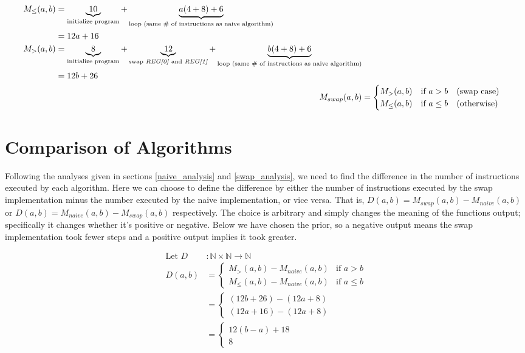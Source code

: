 \documentclass[a4paper,10pt,fleqn]{article}
\begin{document}
\begin{align*}
  \begin{split}
    M_{\leq}(a,b) & = \underbrace{10}_{\text{initialize program}} + \underbrace{a(4 + 8) + 6}_{\text{loop (same \# of instructions as naive algorithm)}} \\
    & = 12a + 16 \\
    M_{>}(a,b) & = \underbrace{8}_{\text{initialize program}} + \underbrace{12}_{\text{swap \emph{REG[0]} and \emph{REG[1]}}} + \underbrace{b(4 + 8) + 6}_{\text{loop (same \# of instructions as naive algorithm)}} \\
    & = 12b + 26
  \end{split} \\
  M_{swap}(a,b) & =
  \begin{cases}
    M_{>}(a,b) & \text{if } a > b \quad \text{(swap case)} \\
    M_{\leq}(a,b) & \text{if } a \leq b \quad \text{(otherwise)}
  \end{cases}
\end{align*}

\section{Comparison of Algorithms}
Following the analyses given in sections \ref{naive_analysis} and \ref{swap_analysis}, we need
to find the difference in the number of instructions executed by each algorithm. Here we can
choose to define the difference by either the number of instructions executed by the swap
implementation minus the number executed by the naive implementation, or vice versa. That is,
$D(a,b) = M_{swap}(a,b) - M_{naive}(a,b)$ or $D(a,b) = M_{naive}(a,b) - M_{swap}(a,b)$ respectively. The
choice is arbitrary and simply changes the meaning of the functions output; specifically it
changes whether it's positive or negative. Below we have chosen the prior, so a negative output
means the swap implementation took fewer steps and a positive output implies it took greater.

\begin{align*}
  \text{Let } D & : \mathbb{N} \times \mathbb{N} \to \mathbb{N} \\
  D(a,b) & =
  \begin{cases}
    M_{>}(a,b) - M_{naive}(a,b) & \text{if } a > b \\
    M_{\leq}(a,b) - M_{naive}(a,b) & \text{if } a \leq b
  \end{cases} \\
  & =
  \begin{cases}
    (12b + 26) - (12a + 8) \\
    (12a + 16) - (12a + 8)
  \end{cases} \\
  & =
  \begin{cases}
    12(b - a) + 18 \\
    8
  \end{cases}
\end{align*}
\end{document}
